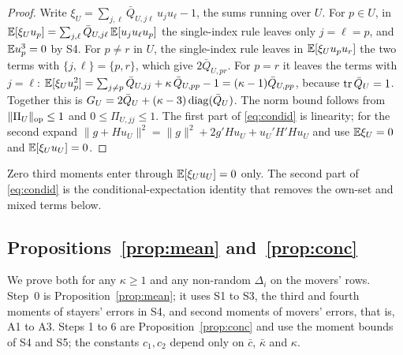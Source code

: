 \begin{proof}
Write $\xi_U=\sum_{j,\ell}\bar Q_{U,j\ell}\,u_ju_\ell-1$, the sums running over $U$. For $p\in U$, in
$\mathbb{E}[\xi_Uu_p]=\sum_{j,\ell}\bar Q_{U,j\ell}\,\mathbb{E}[u_ju_\ell u_p]$ the single-index rule leaves only
$j=\ell=p$, and $\mathbb{E} u_p^3=0$ by S4. For $p\ne r$ in $U$, the single-index rule leaves in
$\mathbb{E}[\xi_Uu_pu_r]$ the two terms with $\{j,\ell\}=\{p,r\}$, which give $2\bar Q_{U,pr}$. For $p=r$ it
leaves the terms with $j=\ell$:
$\mathbb{E}[\xi_Uu_p^2]=\sum_{j\ne p}\bar Q_{U,jj}+\kappa\,\bar Q_{U,pp}-1=(\kappa-1)\bar Q_{U,pp}$, because
$\operatorname{tr}\bar Q_U=1$. Together this is $G_U=2\bar Q_U+(\kappa-3)\operatorname{diag}(\bar Q_U)$. The norm bound follows
from $\|\Pi_U\|_{\mathrm{op}}\le1$ and $0\le\Pi_{U,jj}\le1$. The first part of \eqref{eq:condid} is linearity;
for the second expand $\|g+Hu_U\|^2=\|g\|^2+2g'Hu_U+u_U'H'Hu_U$ and use $\mathbb{E}\xi_U=0$ and
$\mathbb{E}[\xi_Uu_U]=0$.
\end{proof}

Zero third moments enter through $\mathbb{E}[\xi_Uu_U]=0$ only. The second part of \eqref{eq:condid} is the
conditional-expectation identity that removes the own-set and mixed terms below.

\subsection{Propositions~\ref{prop:mean} and~\ref{prop:conc}}

We prove both for any $\kappa\ge1$ and any non-random $\Delta_i$ on the movers' rows. Step~0 is
Proposition~\ref{prop:mean}; it uses S1 to S3, the third and fourth moments of stayers' errors in S4, and second
moments of movers' errors, that is, A1 to A3. Steps 1 to 6 are Proposition~\ref{prop:conc} and use the moment
bounds of S4 and S5; the constants $c_1,c_2$ depend only on $\bar c$, $\bar\kappa$ and $\kappa$.

